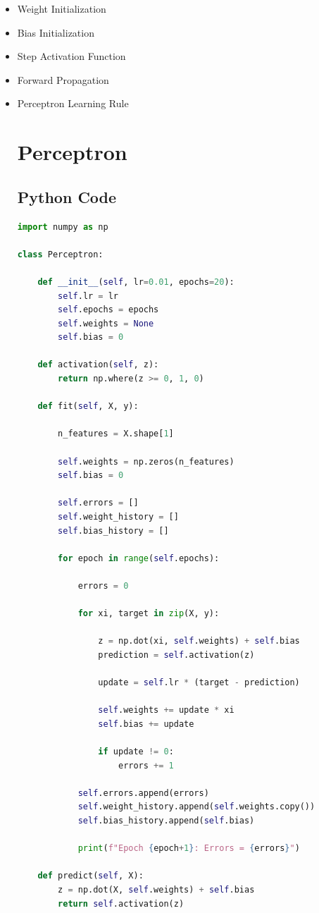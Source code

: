 \documentclass[11pt]{article}
\begin{document}
\begin{itemize}
\item Weight Initialization
\item Bias Initialization
\item Step Activation Function
\item Forward Propagation
\item Perceptron Learning Rule
\section{Perceptron}

\subsection{Python Code}

\begin{lstlisting}[language=Python]
import numpy as np

class Perceptron:

    def __init__(self, lr=0.01, epochs=20):
        self.lr = lr
        self.epochs = epochs
        self.weights = None
        self.bias = 0

    def activation(self, z):
        return np.where(z >= 0, 1, 0)

    def fit(self, X, y):

        n_features = X.shape[1]

        self.weights = np.zeros(n_features)
        self.bias = 0

        self.errors = []
        self.weight_history = []
        self.bias_history = []

        for epoch in range(self.epochs):

            errors = 0

            for xi, target in zip(X, y):

                z = np.dot(xi, self.weights) + self.bias
                prediction = self.activation(z)

                update = self.lr * (target - prediction)

                self.weights += update * xi
                self.bias += update

                if update != 0:
                    errors += 1

            self.errors.append(errors)
            self.weight_history.append(self.weights.copy())
            self.bias_history.append(self.bias)

            print(f"Epoch {epoch+1}: Errors = {errors}")

    def predict(self, X):
        z = np.dot(X, self.weights) + self.bias
        return self.activation(z)
\end{lstlisting}

\end{itemize}
\end{document}
